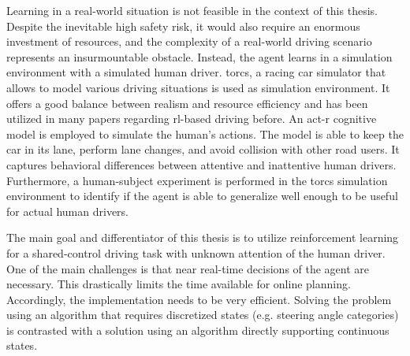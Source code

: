 





Learning in a real-world situation is not feasible in the context of this thesis. Despite the inevitable high safety risk, it would also require an enormous investment of resources, and the complexity of a real-world driving scenario represents an insurmountable obstacle. Instead, the agent learns in a simulation environment with a simulated human driver. \gls{torcs}, a racing car simulator that allows to model various driving situations \parencite{torcs} is used as simulation environment. It offers a good balance between realism and resource efficiency and has been utilized in many papers regarding \gls{rl}-based driving before. An \gls{act-r} cognitive model is employed to simulate the human's actions. The model is able to keep the car in its lane, perform lane changes, and avoid collision with other road users. It captures behavioral differences between attentive and inattentive human drivers. Furthermore, a human-subject experiment is performed in the \gls{torcs} simulation environment to identify if the agent is able to generalize well enough to be useful for actual human drivers.

The main goal and differentiator of this thesis is to utilize reinforcement learning for a shared-control driving task with unknown attention of the human driver. One of the main challenges is that near real-time decisions of the agent are necessary. This drastically limits the time available for online planning. Accordingly, the implementation needs to be very efficient. Solving the problem using an algorithm that requires discretized states (e.g. steering angle categories) is contrasted with a solution using an algorithm directly supporting continuous states.

